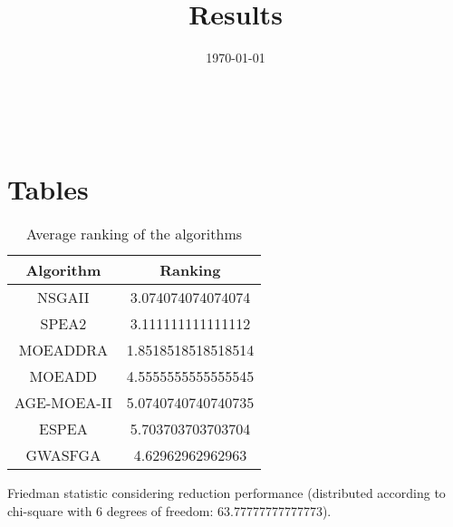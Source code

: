 \documentclass{article}
\title{Results}
\author{}
\date{\today}
\begin{document}
\oddsidemargin 0in \topmargin 0in\maketitle
\
\section{Tables}
\begin{table}[!htp]
\centering
\caption{Average ranking of the algorithms}
\begin{tabular}{c|c}
Algorithm&Ranking\\
\hline
NSGAII&3.074074074074074\\
SPEA2&3.111111111111112\\
MOEADDRA&1.8518518518518514\\
MOEADD&4.5555555555555545\\
AGE-MOEA-II&5.0740740740740735\\
ESPEA&5.703703703703704\\
GWASFGA&4.62962962962963\\
\end{tabular}
\end{table}


Friedman statistic considering reduction performance (distributed according to chi-square with 6 degrees of freedom: 63.77777777777773).
\end{document}
